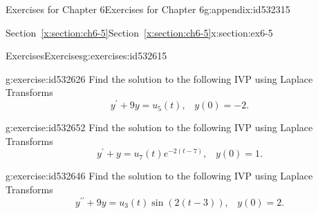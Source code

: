 \documentclass[oneside,10pt,]{book}
\newcommand{\xreffont}{\relax}
\numberwithin{equation}{section}
\numberwithin{equation}{section}
\begin{document}
\begin{appendixptx}{Exercises for Chapter 6}{}{Exercises for Chapter 6}{}{}{g:appendix:id532315}
\typeout{************************************************}
%
\begin{sectionptx}{Section~{\xreffont\ref*{x:section:ch6-5}}}{}{Section~{\xreffont\ref*{x:section:ch6-5}}}{}{}{x:section:ex6-5}
%
%
\typeout{************************************************}
\typeout{************************************************}
%
\begin{exercises-subsection-numberless}{Exercises}{}{Exercises}{}{}{g:exercises:id532615}
\begin{divisionexercise}{1}{}{}{g:exercise:id532626}%
Find the solution to the following IVP using Laplace Transforms%
%
\begin{equation*}
y^{\prime}+9y=u_{5}(t),\,\,\,\,\,y(0)=-2.
\end{equation*}
\end{divisionexercise}%
\begin{divisionexercise}{2}{}{}{g:exercise:id532652}%
Find the solution to the following IVP using Laplace Transforms%
%
\begin{equation*}
y^{\prime}+y=u_{7}(t)e^{-2\left(t-7\right)},\,\,\,\,\,y(0)=1.
\end{equation*}
\end{divisionexercise}%
\begin{divisionexercise}{3}{}{}{g:exercise:id532646}%
Find the solution to the following IVP using Laplace Transforms%
%
\begin{equation*}
y^{\prime\prime}+9y=u_{3}(t)\sin\left(2\left(t-3\right)\right),\,\,\,\,\,y(0)=2.
\end{equation*}
\end{divisionexercise}%
\end{exercises-subsection-numberless}
\end{sectionptx}
\end{appendixptx}
%
\backmatter
%
\end{document}
